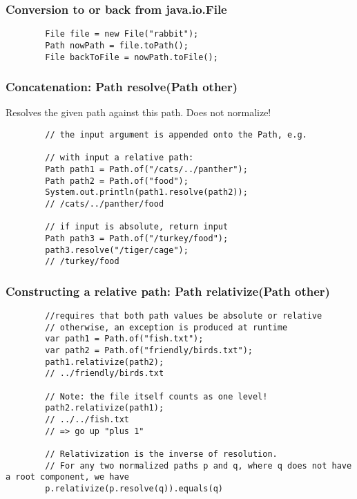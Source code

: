 \documentclass{scrartcl}
\begin{document}
\subsubsection{Conversion to or back from java.io.File}

    \begin{lstlisting}
        File file = new File("rabbit");
        Path nowPath = file.toPath();
        File backToFile = nowPath.toFile();
    \end{lstlisting}

\subsubsection{Concatenation: Path resolve(Path other)}

    Resolves the given path against this path. Does not normalize!

    \begin{lstlisting}
        // the input argument is appended onto the Path, e.g.

        // with input a relative path:
        Path path1 = Path.of("/cats/../panther");
        Path path2 = Path.of("food");
        System.out.println(path1.resolve(path2));
        // /cats/../panther/food

        // if input is absolute, return input
        Path path3 = Path.of("/turkey/food");
        path3.resolve("/tiger/cage");
        // /turkey/food
    \end{lstlisting}

\subsubsection{Constructing a relative path: Path relativize(Path other)}

    \begin{lstlisting}
        //requires that both path values be absolute or relative
        // otherwise, an exception is produced at runtime
        var path1 = Path.of("fish.txt");
        var path2 = Path.of("friendly/birds.txt");
        path1.relativize(path2);
        // ../friendly/birds.txt

        // Note: the file itself counts as one level!
        path2.relativize(path1);
        // ../../fish.txt
        // => go up "plus 1"

        // Relativization is the inverse of resolution.
        // For any two normalized paths p and q, where q does not have a root component, we have
        p.relativize(p.resolve(q)).equals(q)
    \end{lstlisting}
\end{document}
